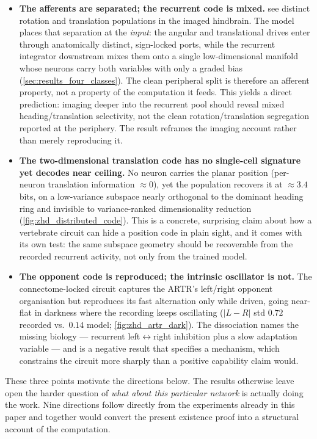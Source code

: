 \documentclass[11pt]{article}
\begin{document}
\begin{itemize}
\item \textbf{The afferents are separated; the recurrent code is mixed.}
   see distinct rotation and translation populations in
  the imaged hindbrain. The model places that separation at the \emph{input}:
  the angular and translational drives enter through anatomically distinct,
  sign-locked ports, while the recurrent integrator downstream mixes them onto
  a single low-dimensional manifold whose neurons carry both variables with
  only a graded bias (\cref{sec:results_four_classes}). The clean peripheral
  split is therefore an afferent property, not a property of the computation it
  feeds. This yields a direct prediction: imaging deeper into the recurrent
  pool should reveal mixed heading/translation selectivity, not the clean
  rotation/translation segregation reported at the periphery. The result
  reframes the imaging account rather than merely reproducing it.
\item \textbf{The two-dimensional translation code has no single-cell
  signature yet decodes near ceiling.} No neuron carries the planar position
  (per-neuron translation information $\approx\!0$), yet the population recovers
  it at $\approx\!3.4$ bits, on a low-variance subspace nearly orthogonal to
  the dominant heading ring and invisible to variance-ranked dimensionality
  reduction (\cref{fig:zhd_distributed_code}). This is a
  concrete, surprising claim about how a vertebrate circuit can hide a position
  code in plain sight, and it comes with its own test: the same subspace
  geometry should be recoverable from the recorded recurrent activity, not only
  from the trained model.
\item \textbf{The opponent code is reproduced; the intrinsic oscillator is
  not.} The connectome-locked circuit captures the ARTR's left/right opponent
  organisation but reproduces its fast alternation only while driven, going
  near-flat in darkness where the recording keeps oscillating ($|L\!-\!R|$ std
  $0.72$ recorded vs.\ $0.14$ model; \cref{fig:zhd_artr_dark}). The dissociation
  names the missing biology --- recurrent left$\leftrightarrow$right inhibition
  plus a slow adaptation variable --- and is a negative result that specifies a
  mechanism, which constrains the circuit more sharply than a positive
  capability claim would.
\end{itemize}

These three points motivate the directions below. The results otherwise leave
open the harder question of \emph{what about this particular network} is
actually doing the work. Nine directions follow directly from the experiments
already in this paper and together would convert the present existence proof
into a structural account of the computation.
\end{document}
